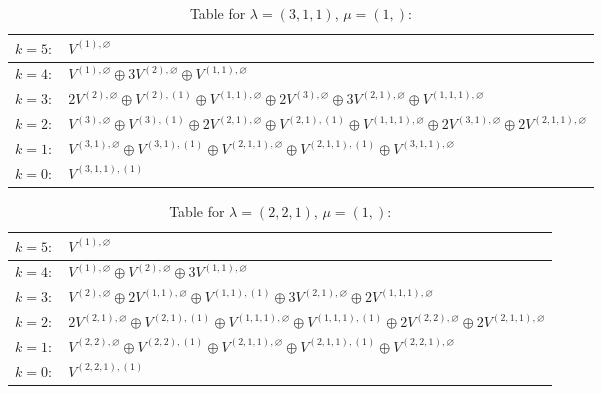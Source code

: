 \documentclass[a4paper,12pt]{article}
\begin{document}
\renewcommand{\arraystretch}{1.6} 
\begin{table}[H]
\centering
\caption{Table for $\lambda = (3, 1, 1)$, $\mu = (1,)$:}
\begin{tabular}{|>{\centering\arraybackslash}p{15cm}|}
\hline
 $k = 5: \quad V^{(1), \varnothing} $ \\ \hline
 $k = 4: \quad V^{(1), \varnothing} \oplus 3 V^{(2), \varnothing} \oplus V^{(1, 1), \varnothing} $ \\ \hline
 $k = 3: \quad 2 V^{(2), \varnothing} \oplus V^{(2), (1)} \oplus V^{(1, 1), \varnothing} \oplus 2 V^{(3), \varnothing} \oplus 3 V^{(2, 1), \varnothing} \oplus V^{(1, 1, 1), \varnothing} $ \\ \hline
 $k = 2: \quad V^{(3), \varnothing} \oplus V^{(3), (1)} \oplus 2 V^{(2, 1), \varnothing} \oplus V^{(2, 1), (1)} \oplus V^{(1, 1, 1), \varnothing} \oplus 2 V^{(3, 1), \varnothing} \oplus 2 V^{(2, 1, 1), \varnothing} $ \\ \hline
 $k = 1: \quad V^{(3, 1), \varnothing} \oplus V^{(3, 1), (1)} \oplus V^{(2, 1, 1), \varnothing} \oplus V^{(2, 1, 1), (1)} \oplus V^{(3, 1, 1), \varnothing} $ \\ \hline
 $k = 0: \quad V^{(3, 1, 1), (1)} $ \\ \hline
\end{tabular}
\end{table}

\renewcommand{\arraystretch}{1.6} 
\begin{table}[H]
\centering
\caption{Table for $\lambda = (2, 2, 1)$, $\mu = (1,)$:}
\begin{tabular}{|>{\centering\arraybackslash}p{15cm}|}
\hline
 $k = 5: \quad V^{(1), \varnothing} $ \\ \hline
 $k = 4: \quad V^{(1), \varnothing} \oplus V^{(2), \varnothing} \oplus 3 V^{(1, 1), \varnothing} $ \\ \hline
 $k = 3: \quad V^{(2), \varnothing} \oplus 2 V^{(1, 1), \varnothing} \oplus V^{(1, 1), (1)} \oplus 3 V^{(2, 1), \varnothing} \oplus 2 V^{(1, 1, 1), \varnothing} $ \\ \hline
 $k = 2: \quad 2 V^{(2, 1), \varnothing} \oplus V^{(2, 1), (1)} \oplus V^{(1, 1, 1), \varnothing} \oplus V^{(1, 1, 1), (1)} \oplus 2 V^{(2, 2), \varnothing} \oplus 2 V^{(2, 1, 1), \varnothing} $ \\ \hline
 $k = 1: \quad V^{(2, 2), \varnothing} \oplus V^{(2, 2), (1)} \oplus V^{(2, 1, 1), \varnothing} \oplus V^{(2, 1, 1), (1)} \oplus V^{(2, 2, 1), \varnothing} $ \\ \hline
 $k = 0: \quad V^{(2, 2, 1), (1)} $ \\ \hline
\end{tabular}
\end{table}
\end{document}
